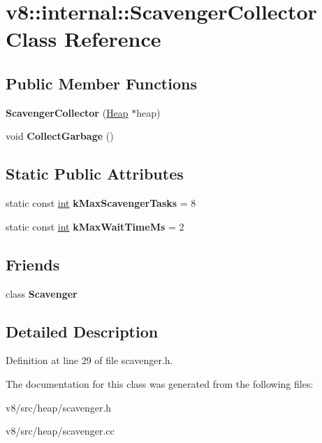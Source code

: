 \hypertarget{classv8_1_1internal_1_1ScavengerCollector}{}\section{v8\+:\+:internal\+:\+:Scavenger\+Collector Class Reference}
\label{classv8_1_1internal_1_1ScavengerCollector}
\subsection*{Public Member Functions}
\begin{DoxyCompactItemize}
\item 
\mbox{\label{classv8_1_1internal_1_1ScavengerCollector_a0d0ba18e637a3c6fa076339f71a7d477}} 
{\bfseries Scavenger\+Collector} (\mbox{\hyperlink{classv8_1_1internal_1_1Heap}{Heap}} $\ast$heap)
\item 
\mbox{\label{classv8_1_1internal_1_1ScavengerCollector_a9f8043360f0e70afd346c2ad23a0b5ab}} 
void {\bfseries Collect\+Garbage} ()
\end{DoxyCompactItemize}
\subsection*{Static Public Attributes}
\begin{DoxyCompactItemize}
\item 
\mbox{\label{classv8_1_1internal_1_1ScavengerCollector_a7369780ac7681f0183ffecc22ef19bab}} 
static const \mbox{\hyperlink{classint}{int}} {\bfseries k\+Max\+Scavenger\+Tasks} = 8
\item 
\mbox{\label{classv8_1_1internal_1_1ScavengerCollector_a8a705f280f0e91d1db5c4e171fbc83ae}} 
static const \mbox{\hyperlink{classint}{int}} {\bfseries k\+Max\+Wait\+Time\+Ms} = 2
\end{DoxyCompactItemize}
\subsection*{Friends}
\begin{DoxyCompactItemize}
\item 
\mbox{\label{classv8_1_1internal_1_1ScavengerCollector_a69194b9c6def4e9ec4e2c07b61f7f5a3}} 
class {\bfseries Scavenger}
\end{DoxyCompactItemize}


\subsection{Detailed Description}


Definition at line 29 of file scavenger.\+h.



The documentation for this class was generated from the following files\+:\begin{DoxyCompactItemize}
\item 
v8/src/heap/scavenger.\+h\item 
v8/src/heap/scavenger.\+cc\end{DoxyCompactItemize}
